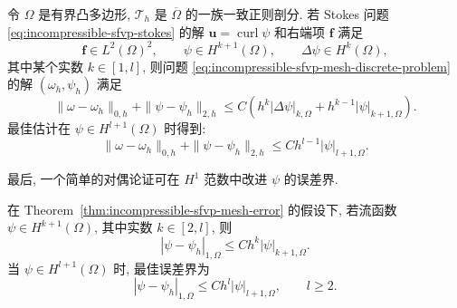 \begin{Theorem}\label{thm:incompressible-sfvp-mesh-error}
令 $\Omega$ 是有界凸多边形,
$\mathcal T_h$ 是 $\overline\Omega$ 的一族一致正则剖分.
若 Stokes 问题 \eqref{eq:incompressible-sfvp-stokes}
的解 $\mathbf u=\operatorname{curl}\psi$ 和右端项 $\mathbf f$ 满足
\[
\mathbf f\in L^2(\Omega)^2,
\qquad
\psi\in H^{k+1}(\Omega),
\qquad
\Delta\psi\in H^k(\Omega),
\]
其中某个实数 $k\in[1,l]$, 则问题
\eqref{eq:incompressible-sfvp-mesh-discrete-problem}
的解 $(\omega_h,\psi_h)$ 满足
\begin{equation}\label{eq:incompressible-sfvp-mesh-error}
\|\omega-\omega_h\|_{0,h}
+\|\psi-\psi_h\|_{2,h}
\leq C\left(h^k|\Delta\psi|_{k,\Omega}
+h^{k-1}|\psi|_{k+1,\Omega}\right).
\end{equation}
最佳估计在 $\psi\in H^{l+1}(\Omega)$ 时得到:
\begin{equation}\label{eq:incompressible-sfvp-mesh-best-error}
\|\omega-\omega_h\|_{0,h}
+\|\psi-\psi_h\|_{2,h}
\leq Ch^{l-1}|\psi|_{l+1,\Omega}.
\end{equation}
\end{Theorem}

最后, 一个简单的对偶论证可在 $H^1$ 范数中改进 $\psi$ 的误差界.

\begin{Theorem}\label{thm:incompressible-sfvp-mesh-h1-error}
在 Theorem~\ref{thm:incompressible-sfvp-mesh-error} 的假设下,
若流函数 $\psi\in H^{k+1}(\Omega)$,
其中实数 $k\in[2,l]$, 则
\begin{equation}\label{eq:incompressible-sfvp-mesh-h1-error}
|\psi-\psi_h|_{1,\Omega}
\leq Ch^k|\psi|_{k+1,\Omega}.
\end{equation}
当 $\psi\in H^{l+1}(\Omega)$ 时, 最佳误差界为
\begin{equation}\label{eq:incompressible-sfvp-mesh-best-h1-error}
|\psi-\psi_h|_{1,\Omega}
\leq Ch^l|\psi|_{l+1,\Omega},
\qquad l\geq2.
\end{equation}
\end{Theorem}

